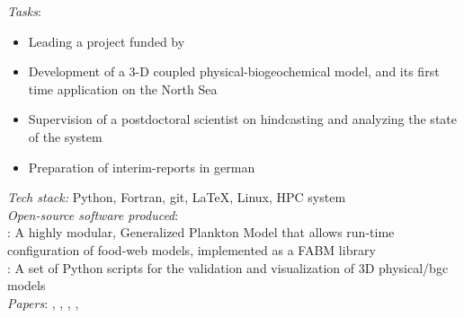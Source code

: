 \documentclass[
	a4paper,
]{fortysecondscv}
\begin{document}
\begin{cvtable}[1.0]
	{\href{https://www.hereon.de/}{\color{pblue}{Helmholtz-Zentrum Hereon, Germany}}}
	{\textit{Tasks}:
	\begin{itemize}[topsep=0pt,itemsep=0pt,partopsep=0pt, parsep=0pt, leftmargin=*]
     \item Leading a project funded by \href{https://www.umweltbundesamt.de/en}{\color{blue}{UBA}}
        \item Development of a 3-D coupled physical-biogeochemical model, and its first time application on the North Sea
        \item Supervision of a postdoctoral scientist on hindcasting and analyzing the state of the system
        \item Preparation of interim-reports in german
    \end{itemize}
      \textit{Tech stack:} Python, Fortran, git, \LaTeX, Linux, HPC system\\
      \textit{Open-source software produced}:\\
      \href{https://github.com/OnurKerimoglu/FABM-GPM}{\color{pblue}{FABM-GPM}}: A highly modular,  Generalized Plankton Model that allows run-time configuration of food-web models, implemented as a FABM library\\
      \href{git@github.com:OnurKerimoglu/3Dval.git}{\color{pblue}{3Dval}}: A set of Python scripts for the validation and visualization of 3D physical/bgc models\\
      \textit{Papers}:
      \href{https://doi.org/10.3389/fmars.2019.00370}{\color{pblue}{1}}, 
      \href{https://doi.org/10.1029/2019JC015987}{\color{pblue}{2}}, 
      \href{https://doi.org/10.5194/bg-17-5097-2020}{\color{pblue}{3}}, 
      \href{https://doi.org/10.3389/fmars.2021.596126}{\color{pblue}{4}}, 
      \href{https://doi.org/10.3389/fmars.2021.637483}{\color{pblue}{5}}
      }
\end{cvtable}


\newpage



{\Huge\color{maincolor}\cvname}
\vspace*{-10mm}
\end{document}
